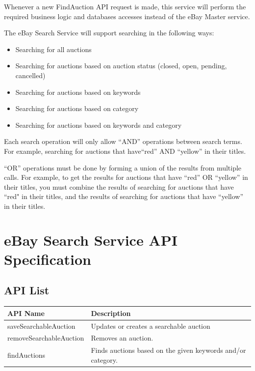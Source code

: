 \documentclass[12pt,a4paper]{article}
\begin{document}
Whenever a new FindAuction API request is made, 
this service will perform the required business logic and databases accesses 
instead of the eBay Master service.

\vspace{\baselineskip}


The eBay Search Service  will support searching in the following ways:

\begin{itemize}
    \item Searching for all auctions
    \item Searching for auctions based on auction status (closed, open, pending, cancelled)
    \item Searching for auctions based on keywords
    \item Searching for auctions based on category
    \item Searching for auctions based on keywords and category
\end{itemize}

Each search operation will only allow ``AND'' operations between search terms. 
For example, searching for auctions that have``red'' AND ``yellow'' in their titles.
\vspace{\baselineskip}

``OR'' operations must be done by forming a union of the results from multiple calls. 
For example, to get the results for auctions that have ``red'' OR ``yellow'' in their titles, 
you must combine the results of searching for auctions that have ``red" in their titles,
and the results of searching for auctions that have ``yellow'' in their titles.


\pagebreak

 
\section{eBay Search Service API Specification}

\subsection{API List}
\begin{center}
    \begin{tabular}{| l | l |}
        \hline
        \textbf{API Name} & \textbf{Description} \\
        \hline
            saveSearchableAuction & Updates or creates a searchable auction \\ 
        \hline
            removeSearchableAuction & Removes an auction. \\
        \hline
            findAuctions & Finds auctions based on the given keywords and/or category. \\
        \hline
    \end{tabular}
\end{center}
\end{document}
